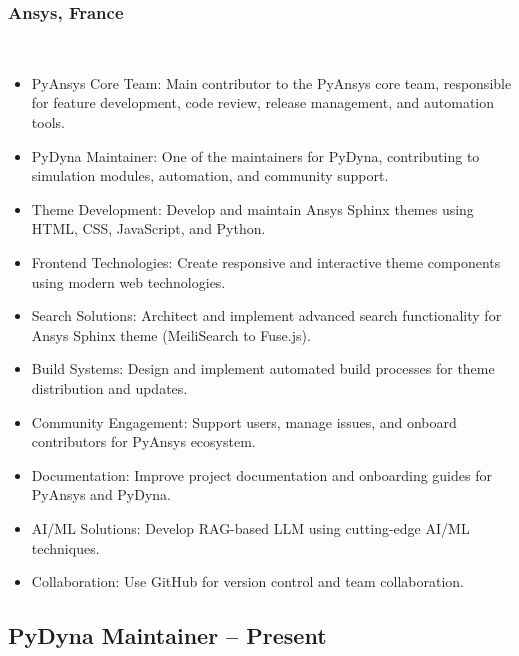 \documentclass[12pt]{article}
\begin{document}
\subsubsection{Ansys, France} \\ \smallskip
\begin{itemize}
    \item[\textbullet] PyAnsys Core Team: Main contributor to the PyAnsys core team, responsible for feature development, code review, release management, and automation tools.
    \item[\textbullet] PyDyna Maintainer: One of the maintainers for PyDyna, contributing to simulation modules, automation, and community support.
    \item[\textbullet] Theme Development: Develop and maintain Ansys Sphinx themes using HTML, CSS, JavaScript, and Python.
    \item[\textbullet] Frontend Technologies: Create responsive and interactive theme components using modern web technologies.
    \item[\textbullet] Search Solutions: Architect and implement advanced search functionality for Ansys Sphinx theme (MeiliSearch to Fuse.js).
    \item[\textbullet] Build Systems: Design and implement automated build processes for theme distribution and updates.
    \item[\textbullet] Community Engagement: Support users, manage issues, and onboard contributors for PyAnsys ecosystem.
    \item[\textbullet] Documentation: Improve project documentation and onboarding guides for PyAnsys and PyDyna.
    \item[\textbullet] AI/ML Solutions: Develop RAG-based LLM using cutting-edge AI/ML techniques.
    \item[\textbullet] Collaboration: Use GitHub for version control and team collaboration.
\end{itemize}

\subsection{PyDyna Maintainer \hfill {}-- Present} \\ \smallskip
\end{document}
